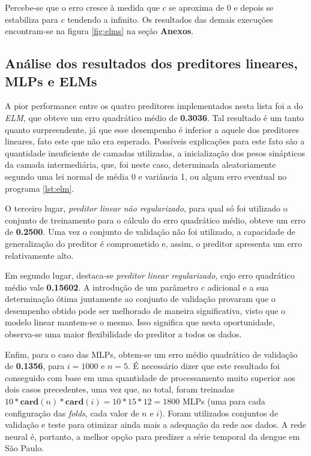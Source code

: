 	\FloatBarrier
	
Percebe-se que o erro cresce à medida que \(c\) se aproxima de 0 e depois se
estabiliza para \(c\) tendendo a infinito.  Os resultados das demais execuções
encontram-se na figura \ref{fig:elms} na seção \textbf{Anexos}.

\subsection{Análise dos resultados dos preditores lineares, MLPs e ELMs}
\label{sec:comparacao}

A pior performance entre os quatro preditores implementados nesta lista foi a
do \textit{ELM}, que obteve um erro quadrático médio de \textbf{0.3036}. Tal
resultado é um tanto quanto surpreendente, já que esse desempenho é inferior a
aquele dos preditores lineares, fato este que não era esperado.  Possíveis
explicações para este fato são a quantidade insuficiente de camadas utilizadas,
a inicialização dos pesos sinápticos da camada intermediária, que, foi neste
caso, determinada aleatoriamente segundo uma lei normal de média 0 e variância
1, ou algum erro eventual no programa \ref{lst:elm}.

\vspace{12pt}

O terceiro lugar, \textit{preditor linear não regularizado}, para qual só foi
utilizado o conjunto de treinamento para o cálculo do erro quadrático médio,
obteve um erro de \textbf{0.2500}. Uma vez o conjunto de validação não foi
utilizado, a capacidade de generalização do preditor é comprometido e, assim, o
preditor apresenta um erro relativamente alto.

\vspace{12pt}

Em segundo lugar, destaca-se \textit{preditor linear regularizado}, cujo erro
quadrático médio vale \textbf{0.15602}. A introdução de um parâmetro \(c\) adicional e a
sua determinação ótima juntamente ao conjunto de validação provaram que o
desempenho obtido pode ser melhorado de maneira significativa, visto que o
modelo linear mantem-se o mesmo. Isso significa que nesta oportunidade,
observa-se uma maior flexibilidade do preditor a todos os dados.

\vspace{12pt}  

Enfim, para o caso das MLPs, obtem-se um erro médio quadrático de validação de
\textbf{0.1356}, para \(i=1000\) e \(n=5\). É necessário dizer que este resultado foi
conseguido com base em uma quantidade de processamento muito superior aos dois
casos precedentes, uma vez que, no total, foram treinadas
\(10*\mathbf{card}(n)*\mathbf{card}(i) = 10*15*12 = 1800\) MLPs (uma para cada
configuração das \textit{folds}, cada valor de \(n\) e \(i\)). Foram utilizados
conjuntos de validação e teste para otimizar ainda mais a adequação da rede aos
dados. A rede neural é, portanto, a melhor opção para predizer a série temporal
da dengue em São Paulo.